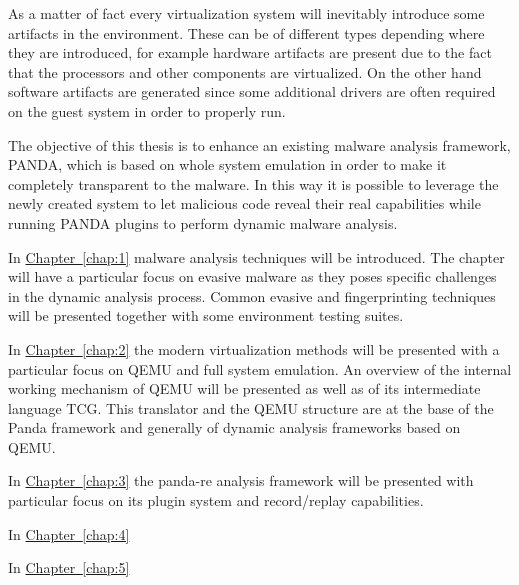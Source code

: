 As a matter of fact every virtualization system will inevitably introduce some artifacts in the environment. These can be of different types depending where they are introduced, for example hardware artifacts are present due to the fact that the processors and other components are virtualized. On the other hand software artifacts are generated since some additional drivers are often required on the guest system in order to properly run. 

The objective of this thesis is to enhance an existing malware analysis framework, PANDA, which is based on whole system emulation in order to make it completely transparent to the malware. In this way it is possible to leverage the newly created system to let malicious code reveal their real capabilities while running PANDA plugins to perform dynamic malware analysis.  


\bigskip
In \hyperref[chap:1]{Chapter~\ref*{chap:1}} malware analysis techniques will be introduced. The chapter will have a particular focus on evasive malware as they poses specific challenges in the dynamic analysis process. Common evasive and fingerprinting techniques will be presented together with some environment testing suites. 


\bigskip
In \hyperref[chap:2]{Chapter~\ref*{chap:2}} the modern virtualization methods will be presented with a particular focus on QEMU and full system emulation. An overview of the internal working mechanism of QEMU will be presented as well as of its intermediate language TCG. This translator and the QEMU structure are at the base of the Panda framework and generally of dynamic analysis frameworks based on QEMU.


\bigskip
In \hyperref[chap:3]{Chapter~\ref*{chap:3}} the panda-re analysis framework will be presented with particular focus on its plugin system and record/replay capabilities. 


\bigskip
In \hyperref[chap:4]{Chapter~\ref*{chap:4}} 


\bigskip
In \hyperref[chap:5]{Chapter~\ref*{chap:5}} 